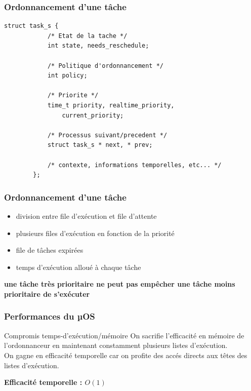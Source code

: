 \documentclass{beamer}
\begin{document}
\begin{frame}[fragile]
    \frametitle{Ordonnancement d'une tâche}
    \begin{lstlisting}[caption=Représentation structurelle d'un processus]
        struct task_s {
            /* Etat de la tache */
            int state, needs_reschedule;

            /* Politique d'ordonnancement */
            int policy;

            /* Priorite */
            time_t priority, realtime_priority,
                current_priority;

            /* Processus suivant/precedent */
            struct task_s * next, * prev;

            /* contexte, informations temporelles, etc... */
        };
    \end{lstlisting}
\end{frame}

\begin{frame}
    \frametitle{Ordonnancement d'une tâche}

    \begin{itemize}
        \item division entre file d'exécution et file d'attente
        \item plusieurs files d'exécution en fonction de la priorité
        \item file de tâches expirées
        \item temps d'exécution alloué à chaque tâche
    \end{itemize}

    \begin{center}
        \bfseries
        une tâche très prioritaire ne peut pas empêcher une tâche moins
        prioritaire de s'exécuter
    \end{center}
\end{frame}

\begin{frame}
    \frametitle{Performances du µOS}

    \begin{block}{Compromis temps-d'exécution/mémoire}
        On sacrifie l'efficacité en mémoire de l'ordonnanceur en maintenant
        constamment plusieurs listes d'exécution. \\
        On gagne en efficacité temporelle car on profite des accés directs aux
        têtes des listes d'exécution.
    \end{block}

     {
        \begin{center}
            \bfseries
            Efficacité temporelle : $O(1)$
        \end{center}
    }
\end{frame}
\end{document}
